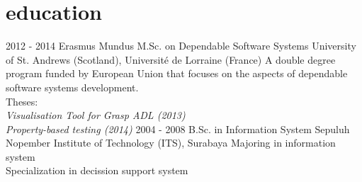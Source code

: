 \documentclass[]{friggeri-cv}
\begin{document}
\section{education}

\begin{entrylist}
  \entry
	{2012 - 2014}
	{Erasmus Mundus M.Sc. on Dependable Software Systems}
	{University of St. Andrews (Scotland), Universit\'{e} de Lorraine (France)}
	{A double degree program funded by European Union that focuses on the aspects
	of dependable software systems development.\\
	Theses:\\
	\emph{Visualisation Tool for Grasp ADL (2013)}\\
	\emph{Property-based testing (2014)}}
  \entry
	{2004 - 2008}
	{B.Sc. in Information System}
	{Sepuluh Nopember Institute of Technology (ITS), Surabaya}
	{Majoring in information system\\
	Specialization in decission support system}
\end{entrylist}
\end{document}
